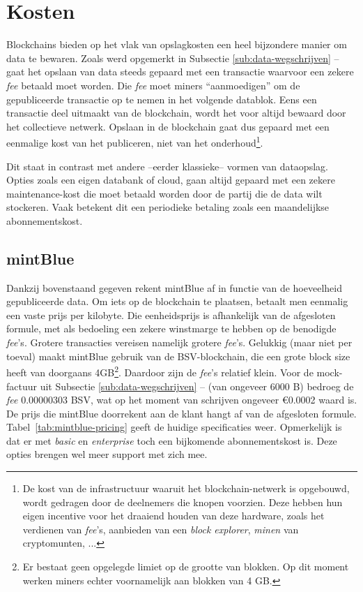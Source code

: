 \section{Kosten}
\label{sub:kosten}

Blockchains bieden op het vlak van opslagkosten een heel bijzondere manier om data te bewaren. Zoals werd opgemerkt in Subsectie \ref{sub:data-wegschrijven} --  gaat het opslaan van data steeds gepaard met een transactie waarvoor een zekere \textit{fee} betaald moet worden. Die \textit{fee} moet miners ``aanmoedigen'' om de gepubliceerde transactie op te nemen in het volgende datablok. Eens een transactie deel uitmaakt van de blockchain, wordt het voor altijd bewaard door het collectieve netwerk. Opslaan in de blockchain gaat dus gepaard met een eenmalige kost van het publiceren, niet van het onderhoud\footnote{De kost van de infrastructuur waaruit het blockchain-netwerk is opgebouwd, wordt gedragen door de deelnemers die knopen voorzien. Deze hebben hun eigen incentive voor het draaiend houden van deze hardware, zoals het verdienen van \textit{fee}'s, aanbieden van een \textit{block explorer}, \textit{minen} van cryptomunten, ...}. 

Dit staat in contrast met andere --eerder klassieke-- vormen van dataopslag. Opties zoals een eigen databank of cloud, gaan altijd gepaard met een zekere maintenance-kost die moet betaald worden door de partij die de data wilt stockeren. 
Vaak betekent dit een periodieke betaling zoals een maandelijkse abonnementskost.

\subsection{mintBlue}
\label{sub:mintblue}

Dankzij bovenstaand gegeven rekent mintBlue af in functie van de hoeveelheid gepubliceerde data. Om iets op de blockchain te plaatsen, betaalt men eenmalig een vaste prijs per kilobyte. Die eenheidsprijs is afhankelijk van de afgesloten formule, met als bedoeling een zekere winstmarge te hebben op de benodigde \textit{fee}'s. Grotere transacties vereisen namelijk grotere \textit{fee}'s. Gelukkig (maar niet per toeval) maakt mintBlue gebruik van de BSV-blockchain, die een grote block size heeft van doorgaans 4GB\footnote{Er bestaat geen opgelegde limiet op de grootte van blokken. Op dit moment werken miners echter voornamelijk aan blokken van 4 GB.}. Daardoor zijn de \textit{fee}'s relatief klein. Voor de mock-factuur uit Subsectie \ref{sub:data-wegschrijven} --  (van ongeveer 6000 B) bedroeg de \textit{fee} 0.00000303 BSV, wat op het moment van schrijven ongeveer \euro 0.0002 waard is. De prijs die mintBlue doorrekent aan de klant hangt af van de afgesloten formule. Tabel~\ref{tab:mintblue-pricing} geeft de huidige specificaties weer. Opmerkelijk is dat er met \textit{basic} en \textit{enterprise} toch een bijkomende abonnementskost is. Deze opties brengen wel meer support met zich mee.

